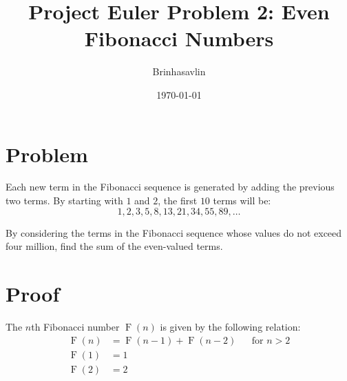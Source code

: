 \documentclass{article}
\title{Project Euler Problem 2: Even Fibonacci Numbers}
\author{Brinhasavlin}
\date{\today}
\begin{document}
\maketitle

\section*{Problem}

Each new term in the Fibonacci sequence is generated by adding the previous two terms. By starting with $1$ and $2$, the
first $10$ terms will be:
\[1, 2, 3, 5, 8, 13, 21, 34, 55, 89, \dots\]

By considering the terms in the Fibonacci sequence whose values do not exceed four million, find the sum of the
even-valued terms.

\section*{Proof}

\begin{definition}\label{def:fib}
  The $n$th Fibonacci number $\operatorname{F}(n)$ is given by the following relation:
\begin{align*}
  \operatorname{F}(n) &= \operatorname{F}(n-1) + \operatorname{F}(n-2)  && \text{for $n > 2$} \\
  \operatorname{F}(1) &= 1 \\
  \operatorname{F}(2) &= 2
\end{align*}
\end{definition}
\end{document}

